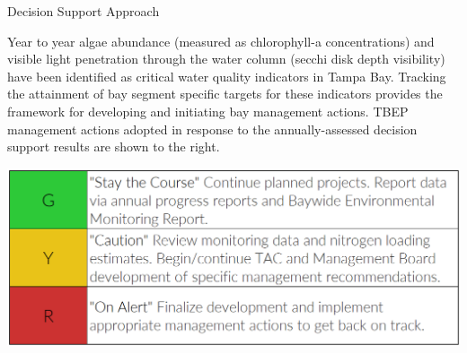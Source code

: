 \documentclass[final,t]{beamer}\usepackage[]{graphicx}\usepackage[]{color}
\begin{document}
\begin{frame}
\begin{columns}[t]
\begin{column}{.79\linewidth}
\begin{block}{Decision Support Approach}
\begin{minipage}{0.5\textwidth}
\footnotesize
Year to year algae abundance (measured as chlorophyll-a concentrations) and visible light penetration through the water column (secchi disk depth visibility) have been identified as critical water quality indicators in Tampa Bay. Tracking the attainment of bay segment specific targets for these indicators provides the framework for developing and initiating bay management actions. TBEP management actions adopted in response to the annually-assessed decision support results are shown to the right.
\end{minipage}
\hspace{0.01in}
\begin{minipage}{0.45\textwidth}
\includegraphics[width=1\textwidth]{www/stoplight.PNG}
\end{minipage}
\end{block}


\end{column}
\end{columns}
\end{frame}
\end{document}
